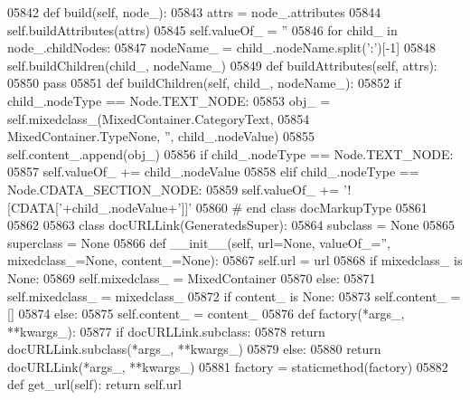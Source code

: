 \begin{DoxyCode}
{{{{{{{{{{{{{{{{{{{{{{{{{{{{{{{{{{{{{{{{{{{{{{{{{{{{{{{{{{{{{{{{{{{{{{{{{{{{{{{{{{{{{{{{{{{{{{{{{{{{{{{{{{{{{{{{{{{{{{{{{{{{{{{{{{{{{{{{{{{{{{{{{{{{{{{{{{{{{{{{{{{{{{{{{{{{{{{{{{{{{{{{{{{{{{{{{{{{{{{{{{{{{{{{{{{{{{{{{{{{{{{{{{{{{{{{{{{{{{{{{{{{{{{{{{{{{{{{{{{{{{{{{{{{{{{{{{{{{{{{{{{{{{{{{{{{{{{{{{{{{{{{{{{{{{{{{{{{{{{{{{{{{{{{{{{{{{{{{{{{{{{{{{{{{{{{{{{{{{{{{05842     \textcolor{keyword}{def }build(self, node\_):
05843         attrs = node\_.attributes
05844         self.buildAttributes(attrs)
05845         self.valueOf_ = \textcolor{stringliteral}{''}
05846         \textcolor{keywordflow}{for} child\_ \textcolor{keywordflow}{in} node\_.childNodes:
05847             nodeName\_ = child\_.nodeName.split(\textcolor{stringliteral}{':'})[-1]
05848             self.buildChildren(child\_, nodeName\_)
05849     \textcolor{keyword}{def }buildAttributes(self, attrs):
05850         \textcolor{keywordflow}{pass}
05851     \textcolor{keyword}{def }buildChildren(self, child\_, nodeName\_):
05852         \textcolor{keywordflow}{if} child\_.nodeType == Node.TEXT\_NODE:
05853             obj\_ = self.mixedclass\_(MixedContainer.CategoryText,
05854                 MixedContainer.TypeNone, \textcolor{stringliteral}{''}, child\_.nodeValue)
05855             self.content\_.append(obj\_)
05856         \textcolor{keywordflow}{if} child\_.nodeType == Node.TEXT\_NODE:
05857             self.valueOf\_ += child\_.nodeValue
05858         \textcolor{keywordflow}{elif} child\_.nodeType == Node.CDATA\_SECTION\_NODE:
05859             self.valueOf\_ += \textcolor{stringliteral}{'![CDATA['}+child\_.nodeValue+\textcolor{stringliteral}{']]'}
05860 \textcolor{comment}{# end class docMarkupType}
05861 
05862 
05863 \textcolor{keyword}{class }docURLLink(GeneratedsSuper):
05864     subclass = \textcolor{keywordtype}{None}
05865     superclass = \textcolor{keywordtype}{None}
05866     \textcolor{keyword}{def }__init__(self, url=None, valueOf\_='', mixedclass\_=None, content\_=None):
05867         self.url = url
05868         \textcolor{keywordflow}{if} mixedclass\_ \textcolor{keywordflow}{is} \textcolor{keywordtype}{None}:
05869             self.mixedclass_ = MixedContainer
05870         \textcolor{keywordflow}{else}:
05871             self.mixedclass_ = mixedclass\_
05872         \textcolor{keywordflow}{if} content\_ \textcolor{keywordflow}{is} \textcolor{keywordtype}{None}:
05873             self.content_ = []
05874         \textcolor{keywordflow}{else}:
05875             self.content_ = content\_
05876     \textcolor{keyword}{def }factory(*args\_, **kwargs\_):
05877         \textcolor{keywordflow}{if} docURLLink.subclass:
05878             \textcolor{keywordflow}{return} docURLLink.subclass(*args\_, **kwargs\_)
05879         \textcolor{keywordflow}{else}:
05880             \textcolor{keywordflow}{return} docURLLink(*args\_, **kwargs\_)
05881     factory = staticmethod(factory)
05882     \textcolor{keyword}{def }get_url(self): \textcolor{keywordflow}{return} self.url
}}}}}}}}}}}}}}}}}}}}}}}}}}}}}}}}}}}}}}}}}}}}}}}}}}}}}}}}}}}}}}}}}}}}}}}}}}}}}}}}}}}}}}}}}}}}}}}}}}}}}}}}}}}}}}}}}}}}}}}}}}}}}}}}}}}}}}}}}}}}}}}}}}}}}}}}}}}}}}}}}}}}}}}}}}}}}}}}}}}}}}}}}}}}}}}}}}}}}}}}}}}}}}}}}}}}}}}}}}}}}}}}}}}}}}}}}}}}}}}}}}}}}}}}}}}}}}}}}}}}}}}}}}}}}}}}}}}}}}}}}}}}}}}}}}}}}}}}}}}}}}}}}}}}}}}}}}}}}}}}}}}}}}}}}}}}}}}}}}}}}}}}}}}}}}}}}}}}}}}}}
\end{DoxyCode}
